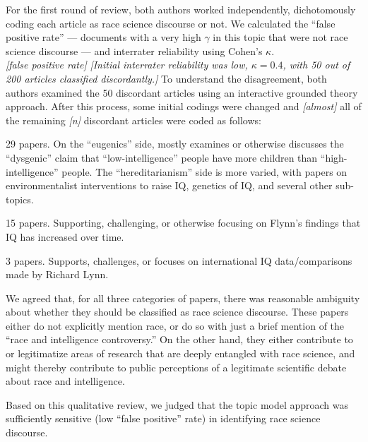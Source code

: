 \documentclass[12pt]{article}
\providecommand{\tightlist}{%
  \setlength{\itemsep}{0pt}\setlength{\parskip}{0pt}}
\begin{document}
For the first round of review, both authors worked independently, dichotomously coding each article as race science discourse or not. We calculated the ``false positive rate'' --- documents with a very high \(\gamma\) in this topic that were not race science discourse --- and interrater reliability using Cohen's \(\kappa\).\\
\emph{{[}false positive rate{]}}
\emph{{[}Initial interrater reliability was low, \(\kappa = 0.4\), with 50 out of 200 articles classified discordantly.{]}} To understand the disagreement, both authors examined the 50 discordant articles using an interactive grounded theory approach. After this process, some initial codings were changed and \emph{{[}almost{]}} all of the remaining \emph{{[}n{]}} discordant articles were coded as follows:

\begin{description}
\tightlist
\item[hereditarianism and/or eugenics]
29 papers. On the ``eugenics'' side, mostly examines or otherwise discusses the ``dysgenic'' claim that ``low-intelligence'' people have more children than ``high-intelligence'' people. The ``hereditarianism'' side is more varied, with papers on environmentalist interventions to raise IQ, genetics of IQ, and several other sub-topics.
\item[Flynn effect]
15 papers. Supporting, challenging, or otherwise focusing on Flynn's findings that IQ has increased over time.
\item[Lynn/national IQ]
3 papers. Supports, challenges, or focuses on international IQ data/comparisons made by Richard Lynn.
\end{description}

We agreed that, for all three categories of papers, there was reasonable ambiguity about whether they should be classified as race science discourse. These papers either do not explicitly mention race, or do so with just a brief mention of the ``race and intelligence controversy.'' On the other hand, they either contribute to or legitimatize areas of research that are deeply entangled with race science, and might thereby contribute to public perceptions of a legitimate scientific debate about race and intelligence.

Based on this qualitative review, we judged that the topic model approach was sufficiently sensitive (low ``false positive'' rate) in identifying race science discourse.



\end{document}
